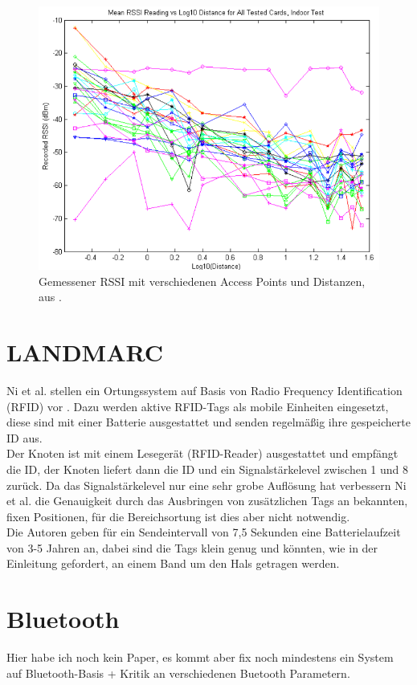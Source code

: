 \begin{figure}[h]
  \centering
	\includegraphics[width=\textwidth]{images/luiRSSI.png}
  \caption{Gemessener RSSI mit verschiedenen Access Points und Distanzen, aus \cite{lui2011differences}.}
  \label{fig:luiRSSI}
\end{figure}

\section{LANDMARC}
\label{ch:Vorherige:sec:LANDMARC}
Ni et al. stellen ein Ortungssystem auf Basis von Radio Frequency Identification (RFID) vor \cite{ni2004landmarc}.
Dazu werden aktive RFID-Tags als mobile Einheiten eingesetzt, diese sind mit einer Batterie ausgestattet und senden regelmäßig ihre gespeicherte ID aus.\\
Der Knoten ist mit einem Lesegerät (RFID-Reader) ausgestattet und empfängt die ID, der Knoten liefert dann die ID und ein Signalstärkelevel zwischen 1 und 8 zurück. 
Da das Signalstärkelevel nur eine sehr grobe Auflösung hat verbessern Ni et al. die Genauigkeit durch das Ausbringen von zusätzlichen Tags an bekannten, fixen Positionen, für die Bereichsortung ist dies aber nicht notwendig.\\
Die Autoren geben für ein Sendeintervall von 7,5 Sekunden eine Batterielaufzeit von 3-5 Jahren an, dabei sind die Tags klein genug und könnten, wie in der Einleitung gefordert, an einem Band um den Hals getragen werden.

\section{Bluetooth}
\label{ch:Vorherige:sec:Bluetooth}
Hier habe ich noch kein Paper, es kommt aber fix noch mindestens ein System auf Bluetooth-Basis + Kritik an verschiedenen Buetooth Parametern.

